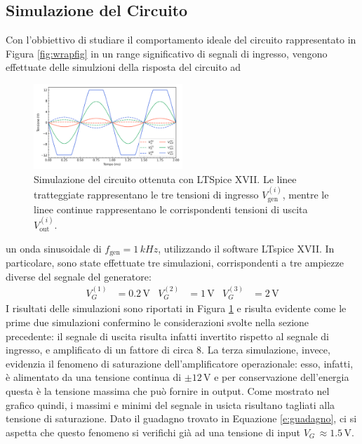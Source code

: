 \documentclass[a4paper,11pt]{article}
\begin{document}
\subsection{Simulazione del Circuito}\label{s:sim}
Con l'obbiettivo di studiare il comportamento ideale del circuito rappresentato in Figura \ref{fig:wrapfig} in un range significativo
di segnali di ingresso, vengono effettuate delle simulzioni della risposta del
circuito ad
\begin{figure}
\centering
\includegraphics[width=0.5\textwidth]{images/lin_simulation}
\caption{\footnotesize Simulazione del circuito ottenuta con LTSpice XVII. Le linee
  tratteggiate rappresentano le tre tensioni di ingresso $V_{\text{gen}}^{(i)}$, mentre le linee continue rappresentano le corrispondenti tensioni di uscita $V_{\text{out}}^{(i)}$.}
\label{fig:lin_sim}
\end{figure}
un onda sinusoidale di $f_{\text{gen}}=1 \, \si{kHz}$, utilizzando il software LTspice
XVII. In particolare, sono state effettuate tre simulazioni, corrispondenti a tre ampiezze diverse
del segnale del generatore:
\begin{align*} V_{G}^{(1)} &= 0.2 \, \si{\volt}
  &
	V_{G}^{(2)}&=1 \, \si{\volt}
  &
	V_{G}^{(3)}&=2 \, \si{\volt}
\end{align*}
I risultati delle simulazioni sono riportati in Figura \ref{fig:lin_sim} e risulta evidente come le prime due simulazioni confermino le considerazioni svolte
nella sezione precedente: il segnale di uscita risulta infatti invertito rispetto al segnale di
ingresso, e amplificato di un fattore di circa $8$.
La terza simulazione, invece, evidenzia il fenomeno di saturazione dell'amplificatore operazionale: esso, infatti, è alimentato da
una tensione continua di $\pm 12 \,\si{\volt}$ e per conservazione dell'energia questa è
la tensione massima che può fornire in output. Come mostrato nel grafico quindi, i massimi e
minimi del segnale in usicta risultano tagliati alla tensione di saturazione.
Dato il guadagno trovato in Equazione \ref{e:guadagno}, ci si aspetta che questo fenomeno si verifichi già ad una tensione di input $V_{G}\, \approx 1.5\, \si{\volt}$.
\end{document}

